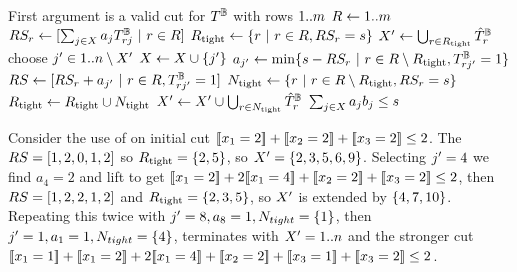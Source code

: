 \documentclass[a4paper,UKenglish,cleveref,autoref,thm-restate]{lipics-v2021}
\begin{document}
\begin{algorithm}
\caption{The \lazyCutlift algorithm}
\label{lst:cutlift}
\begin{algorithmic}[1]
    \Require First argument is a valid cut for $T^{\mathbb{B}}$ with rows $1..m$
    \codeBlockDelim
        \State $R \gets 1..m$
        \State $RS_r \gets [\sum_{j \in X} a_j T^{\mathbb{B}}_{rj} ~|~ r \in R]$ 
        \label{lst:cutlift:RS}
        \State $R_{\text{tight}} \gets \{r ~|~ r \in R, RS_r = s\}$
        \label{lst:cutlift:tight}
        \State $X' \gets \bigcup_{r \in R_{\text{tight}}} \hat{T}^{\mathbb{B}}_r$
        \label{lst:cutlift:X}
        \While{$\Cols \setminus \Xtight \neq \emptyset$ }
            \State choose $j' \in 1..n \setminus X'$
            \State $X \gets X \cup \{j'\}$
            \State $a_{j'} \gets \min \{s - RS_r ~|~ r \in R \setminus R_{\text{tight}}, T^{\mathbb{B}}_{rj'} = 1\}$
            \label{lst:cutlift:a}
            \State $RS \gets [RS_r + a_{j'} ~|~ r \in R, T^{\mathbb{B}}_{rj'}=1]$
            \label{lst:cutlift:RSj}
            \State $N_{\text{tight}} \gets \{r ~|~ r \in R \setminus R_{\text{tight}}, RS_r = s\}$
            \label{lst:cutlift:update:start}
            \State $R_{\text{tight}} \gets R_{\text{tight}} \cup N_{\text{tight}}$
            \State $X' \gets X' \cup \bigcup_{r \in N_{\text{tight}}} \hat{T}^{\mathbb{B}}_r$
            \label{lst:cutlift:update:end}
        \EndWhile
        \State \Return $\sum_{j \in X} a_j b_j \leq s$
    \EndFunction
\end{algorithmic}
\end{algorithm}


\begin{example}
    Consider the use of \lazyCutlift on 
    initial cut $[\![x_{1} = 2]\!] + [\![x_{2} = 2]\!] + [\![x_{3} = 2]\!] \leq 2$.
    The $RS = [1,2,0,1,2]$ so $R_{\text{tight}} = \{2,5\}$, so $X' = 
    \{2, 3, 5, 6, 9\}
    $.
    Selecting $j' = 4$ we find $a_4 = 2$
    and lift to get $\be{1}{2} + 2\be{1}{4} + \be{2}{2} + \be{3}{2} \leq 2$, then $RS = [1,2,2,1,2]$ and 
    $R_{\text{tight}} = \{2,3,5\}$, so $X'$ is extended by $\{4,7,10\}$.
    Repeating this twice with $j' = 8, a_{8} = 1, N_{tight} = \{1\}$, then $j' = 1, a_{1} = 1, N_{tight} = \{4\}$, terminates \lazyCutlift with $X' = 1..n$ and the stronger cut $\be{1}{1} + \be{1}{2} + 2\be{1}{4} + \be{2}{2} + \be{3}{1} + \be{3}{2} \leq 2$.
\end{example}
\end{document}
